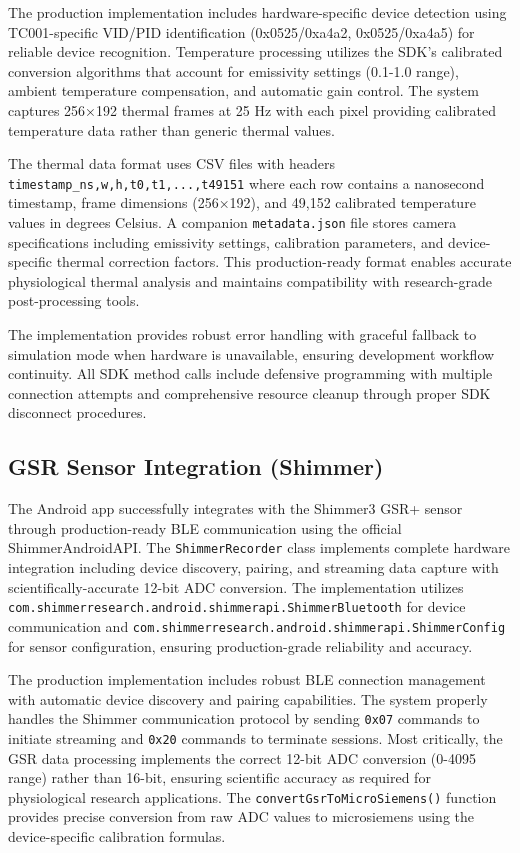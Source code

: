 The production implementation includes hardware-specific device detection using TC001-specific VID/PID identification (0x0525/0xa4a2, 0x0525/0xa4a5) for reliable device recognition. Temperature processing utilizes the SDK's calibrated conversion algorithms that account for emissivity settings (0.1-1.0 range), ambient temperature compensation, and automatic gain control. The system captures 256×192 thermal frames at 25 Hz with each pixel providing calibrated temperature data rather than generic thermal values.

The thermal data format uses CSV files with headers \texttt{timestamp\_ns,w,h,t0,t1,...,t49151} where each row contains a nanosecond timestamp, frame dimensions (256×192), and 49{,}152 calibrated temperature values in degrees Celsius. A companion \texttt{metadata.json} file stores camera specifications including emissivity settings, calibration parameters, and device-specific thermal correction factors. This production-ready format enables accurate physiological thermal analysis and maintains compatibility with research-grade post-processing tools.

The implementation provides robust error handling with graceful fallback to simulation mode when hardware is unavailable, ensuring development workflow continuity. All SDK method calls include defensive programming with multiple connection attempts and comprehensive resource cleanup through proper SDK disconnect procedures.

\subsection{GSR Sensor Integration (Shimmer)}\label{sec:4-2-2}
The Android app successfully integrates with the Shimmer3 GSR+ sensor through production-ready BLE communication using the official ShimmerAndroidAPI. The \texttt{ShimmerRecorder} class implements complete hardware integration including device discovery, pairing, and streaming data capture with scientifically-accurate 12-bit ADC conversion. The implementation utilizes \texttt{com.shimmerresearch.android.shimmerapi.ShimmerBluetooth} for device communication and \texttt{com.shimmerresearch.android.shimmerapi.ShimmerConfig} for sensor configuration, ensuring production-grade reliability and accuracy.

The production implementation includes robust BLE connection management with automatic device discovery and pairing capabilities. The system properly handles the Shimmer communication protocol by sending \texttt{0x07} commands to initiate streaming and \texttt{0x20} commands to terminate sessions. Most critically, the GSR data processing implements the correct 12-bit ADC conversion (0-4095 range) rather than 16-bit, ensuring scientific accuracy as required for physiological research applications. The \texttt{convertGsrToMicroSiemens()} function provides precise conversion from raw ADC values to microsiemens using the device-specific calibration formulas.

